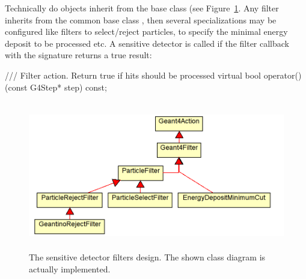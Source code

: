 \documentclass[10pt,a4paper]{article}
\begin{document}
\noindent
Technically do  objects inherit from the base class
 (see Figure~\ref{fig:ddg4-implementation-sensitive-detector-filters}.
Any filter inherits from the common base class , then 
several specializations may be configured like filters to select/reject 
particles, to specify the minimal energy deposit to be processed etc.
A sensitive detector is called if the filter callback with the signature
returns a true result:
\begin{unnumberedcode}
  /// Filter action. Return true if hits should be processed
  virtual bool operator()(const G4Step* step) const;
\end{unnumberedcode}
\begin{figure}[h]
  \begin{center}
    \includegraphics[height=65mm] {DDG4-SensitiveFilterClasses.png}
    \caption{The sensitive detector filters design. The shown class
        diagram is actually implemented.}
    \label{fig:ddg4-implementation-sensitive-detector-filters}
  \end{center}
\end{figure}

\newpage

\end{document}
